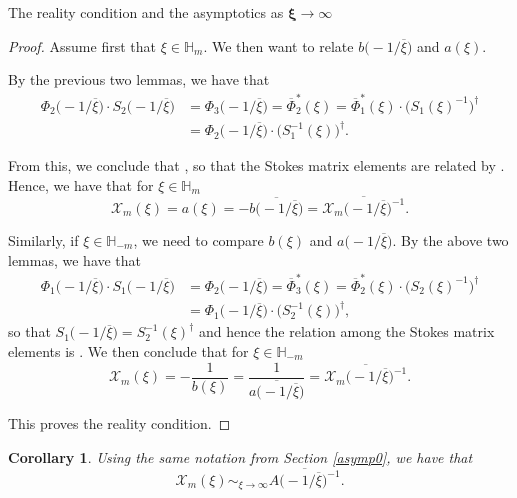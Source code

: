 \documentclass[11pt]{article}
\numberwithin{equation}{section}
\newtheorem{Corollary}[Theorem]{Corollary}
\numberwithin{equation}{section}
\newcommand{\MC}{\mathcal{X}_m}
\begin{document}
\begin{subsubsection}{The reality condition and the asymptotics as $\boldsymbol{\xi \to \infty}$}
\begin{proof}
Assume first that $\xi \in \mathbb{H}_m$. We then want to relate $b\bigl(-1/\overline{\xi}\bigr)$ and $a(\xi)$.

By the previous two lemmas, we have that
\begin{align*}
\Phi_2\bigl(-1/\overline{\xi}\bigr)\cdot S_2\bigl(-1/\overline{\xi}\bigr)&=\Phi_3\bigl(-1/\overline{\xi}\bigr)=\overline{\Phi}^*_2(\xi)=\overline{\Phi}^*_1(\xi)\cdot \bigl(S_1(\xi)^{-1}\bigr)^{\dagger}\\
&=\Phi_2\bigl(-1/\overline{\xi}\bigr)\cdot\bigl(S_1^{-1}(\xi)\bigr)^{\dagger}.
\end{align*}

From this, we conclude that , so that the Stokes matrix elements are related by . Hence, we have that for $\xi \in \mathbb{H}_{m}$
\begin{equation*}
 \mathcal{X}_m(\xi)=a(\xi)=-\overline{b\bigl(-1/\overline{\xi}\bigr)}=\overline{\mathcal{X}_m\bigl(-1/\overline{\xi}\bigr)^{-1}}.
\end{equation*}

Similarly, if $\xi \in \mathbb{H}_{-m}$, we need to compare $b(\xi)$ and $a\bigl(-1/\overline{\xi}\bigr)$. By the above two lemmas, we have that
\begin{align*}
 \Phi_1\bigl(-1/\overline{\xi}\bigr)\cdot S_1\bigl(-1/\overline{\xi}\bigr)&=\Phi_2\bigl(-1/\overline{\xi}\bigr)=\overline{\Phi}^*_3(\xi)=\overline{\Phi}^*_2(\xi)\cdot \bigl(S_2(\xi)^{-1}\bigr)^{\dagger}\\
 &=\Phi_1\bigl(-1/\overline{\xi}\bigr)\cdot\bigl(S_2^{-1}(\xi)\bigr)^{\dagger},
\end{align*}
so that $S_1\bigl(-1/\overline{\xi}\bigr)=S_2^{-1}(\xi)^{\dagger}$ and hence the relation among the Stokes matrix elements is . We then conclude that for $\xi \in \mathbb{H}_{-m}$
\begin{equation*}
 \mathcal{X}_m(\xi)=-\frac{1}{b(\xi)}=\frac{1}{\overline{a\bigl(-1/\overline{\xi}\bigr)}}=\overline{\mathcal{X}_m\bigl(-1/\overline{\xi}\bigr)^{-1}}.
\end{equation*}

This proves the reality condition.
\end{proof}

\begin{Corollary} \label{rcc}Using the same notation from Section {\rm\ref{asymp0}}, we have that
\begin{equation*}
 \MC(\xi)\sim_{\xi \to \infty} \overline{A\bigl(-1/\overline{\xi}\bigr)^{-1}}.
\end{equation*}


\end{Corollary}
\end{subsubsection}
\end{document}
